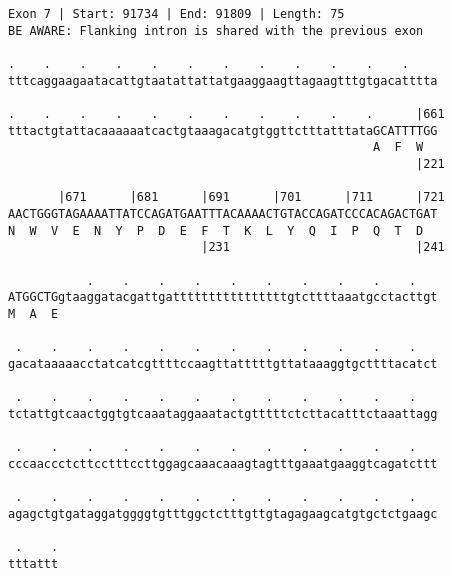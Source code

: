 \documentclass{article}
\begin{document}
\begin{Verbatim}
Exon 7 | Start: 91734 | End: 91809 | Length: 75
BE AWARE: Flanking intron is shared with the previous exon
 
.    .    .    .    .    .    .    .    .    .    .    .    
tttcaggaagaatacattgtaatattattatgaaggaagttagaagtttgtgacatttta
  
.    .    .    .    .    .    .    .    .    .    .      |661
tttactgtattacaaaaaatcactgtaaagacatgtggttctttatttataGCATTTTGG
                                                   A  F  W  
                                                         |221
  
       |671      |681      |691      |701      |711      |721
AACTGGGTAGAAAATTATCCAGATGAATTTACAAAACTGTACCAGATCCCACAGACTGAT
N  W  V  E  N  Y  P  D  E  F  T  K  L  Y  Q  I  P  Q  T  D  
                           |231                          |241
  
           .    .    .    .    .    .    .    .    .    .   
ATGGCTGgtaaggatacgattgattttttttttttttttgtcttttaaatgcctacttgt
M  A  E                                                     
  
 .    .    .    .    .    .    .    .    .    .    .    .   
gacataaaaacctatcatcgttttccaagttatttttgttataaaggtgcttttacatct
  
 .    .    .    .    .    .    .    .    .    .    .    .   
tctattgtcaactggtgtcaaataggaaatactgtttttctcttacatttctaaattagg
  
 .    .    .    .    .    .    .    .    .    .    .    .   
cccaaccctcttcctttccttggagcaaacaaagtagtttgaaatgaaggtcagatcttt
  
 .    .    .    .    .    .    .    .    .    .    .    .   
agagctgtgataggatggggtgtttggctctttgttgtagagaagcatgtgctctgaagc
  
 .    .
tttattt
\end{Verbatim}
\newpage
\end{document}
